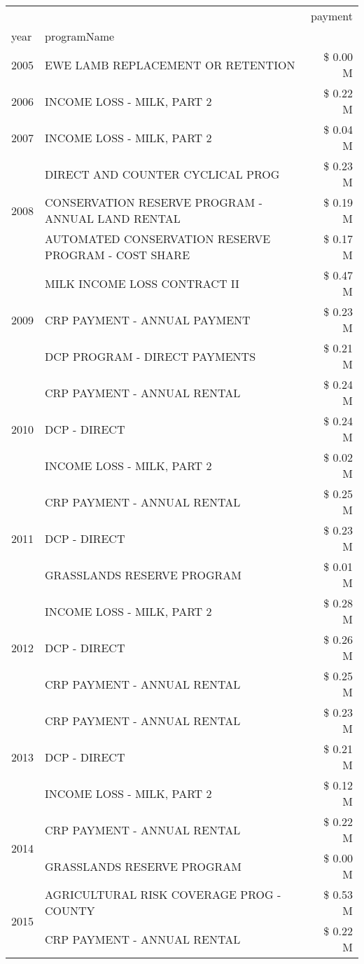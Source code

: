 \begin{tabular}{llr}
\toprule
 &  & payment \\
year & programName &  \\
\midrule
2005 & EWE LAMB REPLACEMENT OR RETENTION & \$ 0.00 M \\
\cline{1-3}
2006 & INCOME LOSS - MILK, PART 2 & \$ 0.22 M \\
\cline{1-3}
2007 & INCOME LOSS - MILK, PART 2 & \$ 0.04 M \\
\cline{1-3}
\multirow[t]{3}{*}{2008} & DIRECT AND COUNTER CYCLICAL PROG & \$ 0.23 M \\
 & CONSERVATION RESERVE PROGRAM - ANNUAL LAND RENTAL & \$ 0.19 M \\
 & AUTOMATED CONSERVATION RESERVE PROGRAM - COST SHARE & \$ 0.17 M \\
\cline{1-3}
\multirow[t]{3}{*}{2009} & MILK INCOME LOSS CONTRACT II & \$ 0.47 M \\
 & CRP PAYMENT - ANNUAL PAYMENT & \$ 0.23 M \\
 & DCP PROGRAM - DIRECT PAYMENTS & \$ 0.21 M \\
\cline{1-3}
\multirow[t]{3}{*}{2010} & CRP PAYMENT - ANNUAL RENTAL & \$ 0.24 M \\
 & DCP - DIRECT & \$ 0.24 M \\
 & INCOME LOSS - MILK, PART 2 & \$ 0.02 M \\
\cline{1-3}
\multirow[t]{3}{*}{2011} & CRP PAYMENT - ANNUAL RENTAL & \$ 0.25 M \\
 & DCP - DIRECT & \$ 0.23 M \\
 & GRASSLANDS RESERVE PROGRAM & \$ 0.01 M \\
\cline{1-3}
\multirow[t]{3}{*}{2012} & INCOME LOSS - MILK, PART 2 & \$ 0.28 M \\
 & DCP - DIRECT & \$ 0.26 M \\
 & CRP PAYMENT - ANNUAL RENTAL & \$ 0.25 M \\
\cline{1-3}
\multirow[t]{3}{*}{2013} & CRP PAYMENT - ANNUAL RENTAL & \$ 0.23 M \\
 & DCP - DIRECT & \$ 0.21 M \\
 & INCOME LOSS - MILK, PART 2 & \$ 0.12 M \\
\cline{1-3}
\multirow[t]{2}{*}{2014} & CRP PAYMENT - ANNUAL RENTAL & \$ 0.22 M \\
 & GRASSLANDS RESERVE PROGRAM & \$ 0.00 M \\
\cline{1-3}
\multirow[t]{3}{*}{2015} & AGRICULTURAL RISK COVERAGE PROG - COUNTY & \$ 0.53 M \\
 & CRP PAYMENT - ANNUAL RENTAL & \$ 0.22 M \\

\end{tabular}
